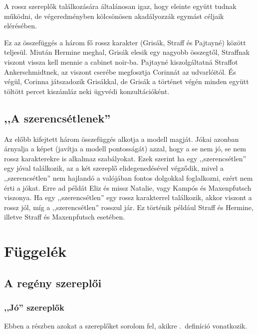 \documentclass{thesis-ekf}
\theoremstyle{definition}
\begin{document}
    A rossz szereplők találkozására általánosan igaz, hogy eleinte együtt tudnak működni,
        de végeredményben kölcsönösen akadályozzák egymást céljaik elérésében.

    Ez az összefüggés a három fő rossz karakter (Grisák, Straff és Pajtayné) között teljesül.
    Miután Hermine meghal, Grisák elesik egy nagyobb összegtől, Straffnak viszont vissza kell mennie a cabinet noir-ba.
    Pajtayné kiszolgáltatná Straffot Ankerschmidtnek, az viszont cserébe megfosztja Corinnát az udvarlóitól.
    És végül, Corinna játszadozik Grisákkal, de Grisák a történet végén minden együtt töltött percet
        kiszámláz neki ügyvédi konzultációként.

    \section{,,A szerencsétlenek''}\label{sec_a-szerencsetlenek''}

    Az előbb kifejtett három összefüggés alkotja a modell magját.
    Jókai azonban árnyalja a képet (javítja a modell pontosságát) azzal, hogy a se nem jó, se nem rossz karakterekre is
        alkalmaz szabályokat.
    Ezek szerint ha egy ,,szerencsétlen'' egy jóval találkozik, az a két szereplő elidegenedésével végződik,
    mivel a ,,szerencsétlen'' nem hajlandó a valójában fontos dolgokkal foglalkozni, ezért nem érti a jókat.
    Erre ad példát Eliz és missz Natalie, vagy Kampós és Maxenpfutsch viszonya.
    Ha egy ,,szerencsétlen'' egy rossz karakterrel találkozik, akkor viszont a rossz jól,
        míg a ,,szerencsétlen'' rosszul jár.
    Ez történik például Straff és Hermine, illetve Straff és Maxenpfutsch esetében.

    \chapter{Függelék}\label{ch:fuggelek}

    \section{A regény szereplői}

    \subsection{,,Jó'' szereplők}

    Ebben a részben azokat a szereplőket sorolom fel, akikre .~definíció vonatkozik.
\end{document}
